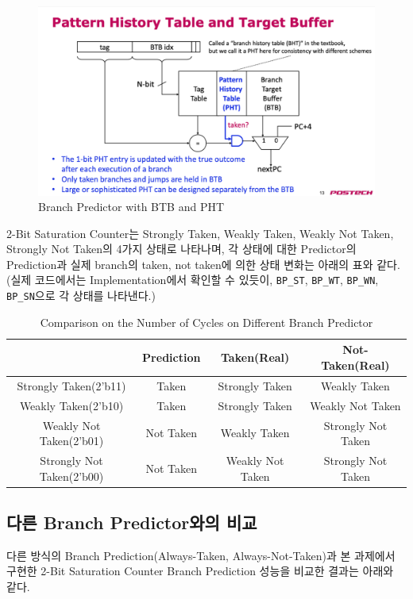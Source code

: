 \documentclass[openright, a4paper]{article}
\newcommand{\code}[1]{\texttt{#1}}
\begin{document}
\begin{figure}[h]
    \centering
    \includegraphics[width=0.8\linewidth]{img/branch_predictor_btb_and_pht.png}
    \caption{Branch Predictor with BTB and PHT}
\end{figure}

2-Bit Saturation Counter는 Strongly Taken, Weakly Taken, Weakly Not Taken, Strongly Not Taken의 4가지 상태로 나타나며, 각 상태에 대한 Predictor의 Prediction과 실제 branch의 taken, not taken에 의한 상태 변화는 아래의 표와 같다.
(실제 코드에서는 Implementation에서 확인할 수 있듯이, \code{BP_ST}, \code{BP_WT}, \code{BP_WN}, \code{BP_SN}으로 각 상태를 나타낸다.)

\begin{table}[!h]
  \centering
  \begin{tabular}{@{}cccc@{}}
    \hline
     & Prediction & Taken(Real) & Not-Taken(Real) \\
    \hline
    Strongly Taken(2'b11) & Taken & Strongly Taken & Weakly Taken \\
    Weakly Taken(2'b10) & Taken & Strongly Taken & Weakly Not Taken \\
    Weakly Not Taken(2'b01) & Not Taken & Weakly Taken & Strongly Not Taken \\
    Strongly Not Taken(2'b00) & Not Taken & Weakly Not Taken & Strongly Not Taken \\
    \hline
  \end{tabular}
  \caption{Comparison on the Number of Cycles on Different Branch Predictor}
  \label{tab:comparison}
\end{table}

\subsection{다른 Branch Predictor와의 비교}

다른 방식의 Branch Prediction(Always-Taken, Always-Not-Taken)과 본 과제에서 구현한 2-Bit Saturation Counter Branch Prediction 성능을 비교한 결과는 아래와 같다.
\end{document}
